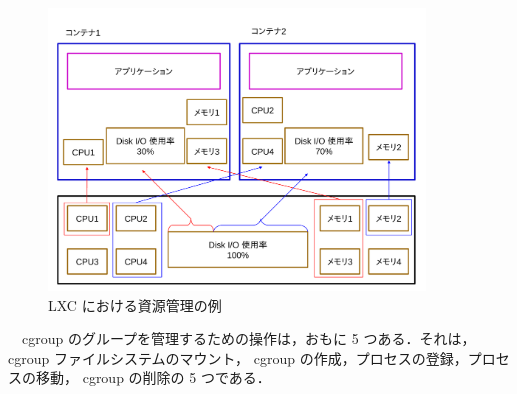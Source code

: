 \documentclass[graduation-thesis]{jsarticle}
\begin{document}
\begin{figure}[H]
	\begin{center}
		\includegraphics[width=10.0cm, clip]{images/container.pdf}
		\caption{LXC における資源管理の例}
		\label{fig:grouping}
	\end{center}
\end{figure}
　cgroup のグループを管理するための操作は，おもに 5 つある．それは， cgroup ファイルシステムのマウント， cgroup の作成，プロセスの登録，プロセスの移動， cgroup の削除の 5 つである．
\end{document}
